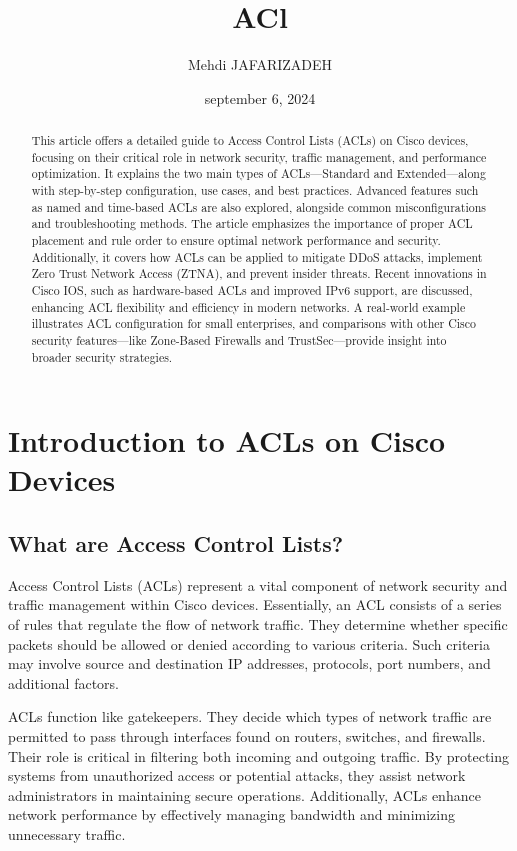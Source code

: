 \documentclass[11pt,a4paper]{article}
\title{ACl}
\author{Mehdi JAFARIZADEH}
\date{september 6, 2024}
\begin{document}
\maketitle

\begin{abstract}
    This article offers a detailed guide to Access Control Lists (ACLs) on Cisco devices, focusing on their critical role in network security, traffic management, and performance optimization. It explains the two main types of ACLs—Standard and Extended—along with step-by-step configuration, use cases, and best practices. Advanced features such as named and time-based ACLs are also explored, alongside common misconfigurations and troubleshooting methods. The article emphasizes the importance of proper ACL placement and rule order to ensure optimal network performance and security. Additionally, it covers how ACLs can be applied to mitigate DDoS attacks, implement Zero Trust Network Access (ZTNA), and prevent insider threats. Recent innovations in Cisco IOS, such as hardware-based ACLs and improved IPv6 support, are discussed, enhancing ACL flexibility and efficiency in modern networks. A real-world example illustrates ACL configuration for small enterprises, and comparisons with other Cisco security features—like Zone-Based Firewalls and TrustSec—provide insight into broader security strategies.
\end{abstract}

\newpage

\section*{Introduction to ACLs on Cisco Devices}
    \subsection*{What are Access Control Lists?}
        Access Control Lists (ACLs) represent a vital component of network security and traffic management within Cisco devices. Essentially, an ACL consists of a series of rules that regulate the flow of network traffic. They determine whether specific packets should be allowed or denied according to various criteria. Such criteria may involve source and destination IP addresses, protocols, port numbers, and additional factors.

        ACLs function like gatekeepers. They decide which types of network traffic are permitted to pass through interfaces found on routers, switches, and firewalls. Their role is critical in filtering both incoming and outgoing traffic. By protecting systems from unauthorized access or potential attacks, they assist network administrators in maintaining secure operations. Additionally, ACLs enhance network performance by effectively managing bandwidth and minimizing unnecessary traffic.
\end{document}
